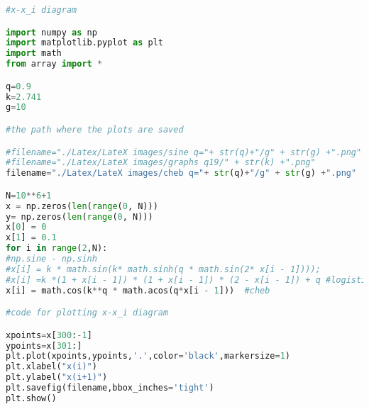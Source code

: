 \begin{lstlisting}[language=Python]
#x-x_i diagram

import numpy as np
import matplotlib.pyplot as plt
import math
from array import *

q=0.9
k=2.741
g=10

#the path where the plots are saved

#filename="./Latex/LateX images/sine q="+ str(q)+"/g" + str(g) +".png"
#filename="./Latex/LateX images/graphs q19/" + str(k) +".png"
filename="./Latex/LateX images/cheb q="+ str(q)+"/g" + str(g) +".png"

N=10**6+1
x = np.zeros(len(range(0, N)))
y= np.zeros(len(range(0, N)))
x[0] = 0
x[1] = 0.1
for i in range(2,N):
#np.sine - np.sinh
#x[i] = k * math.sin(k* math.sinh(q * math.sin(2* x[i - 1])));
#x[i] =k *(1 + x[i - 1]) * (1 + x[i - 1]) * (2 - x[i - 1]) + q #logistic
x[i] = math.cos(k**q * math.acos(q*x[i - 1]))  #cheb

#code for plotting x-x_i diagram   

xpoints=x[300:-1]
ypoints=x[301:]
plt.plot(xpoints,ypoints,'.',color='black',markersize=1)
plt.xlabel("x(i)")
plt.ylabel("x(i+1)")
plt.savefig(filename,bbox_inches='tight')
plt.show()
\end{lstlisting}
\clearpage
